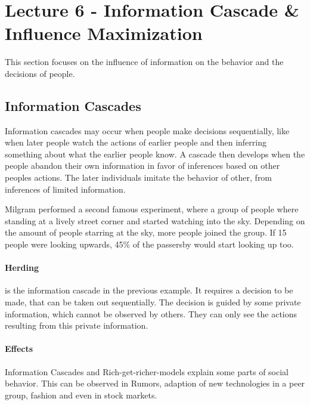 \section{Lecture 6 - Information Cascade \& Influence Maximization} %
\label{sec:lecture_6_information_cascade_&_influence_maximization}

This section focuses on the influence of information on the behavior
and the decisions of people.

\subsection{Information Cascades} %
\label{sub:information_cascades}
Information cascades may occur when people make decisions sequentially,
like when later people watch the actions of earlier people
and then inferring something about what the earlier people know.
A cascade then develops when the people abandon their own information
in favor of inferences based on other peoples actions.
The later individuals imitate the behavior of other,
from inferences of limited information.

Milgram performed a second famous experiment,
where a group of people where standing at a lively street corner
and started watching into the sky.
Depending on the amount of people starring at the sky,
more people joined the group.
If 15 people were looking upwards,
45\% of the passersby would start looking up too.

\paragraph{Herding} %
\label{par:herding}
is the information cascade in the previous example.
It requires a decision to be made,
that can be taken out sequentially.
The decision is guided by some private information,
which cannot be observed by others.
They can only see the actions resulting from this private information.

\paragraph{Effects} %
\label{par:effects}
Information Cascades and Rich-get-richer-models explain some parts of social behavior.
This can be observed in Rumors,
adaption of new technologies in a peer group,
fashion and even in stock markets.


